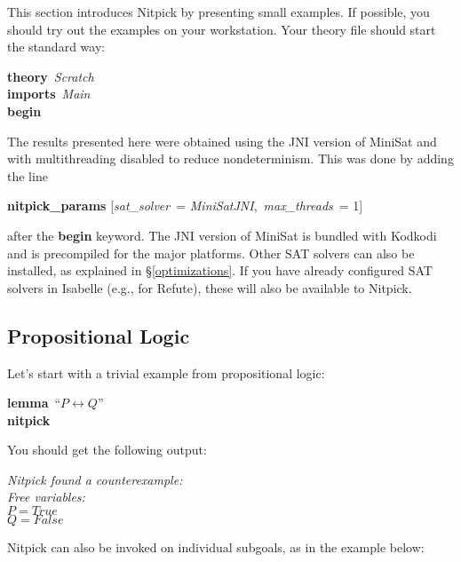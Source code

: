 \documentclass[a4paper,12pt]{article}
\begin{document}
This section introduces Nitpick by presenting small examples. If possible, you
should try out the examples on your workstation. Your theory file should start
the standard way:

\prew
\textbf{theory}~\textit{Scratch} \\
\textbf{imports}~\textit{Main} \\
\textbf{begin}
\postw

The results presented here were obtained using the JNI version of MiniSat and
with multithreading disabled to reduce nondeterminism. This was done by adding
the line

\prew
\textbf{nitpick\_params} [\textit{sat\_solver}~= \textit{MiniSatJNI}, \,\textit{max\_threads}~= 1]
\postw

after the \textbf{begin} keyword. The JNI version of MiniSat is bundled with
Kodkodi and is precompiled for the major platforms. Other SAT solvers can also
be installed, as explained in \S\ref{optimizations}. If you have already
configured SAT solvers in Isabelle (e.g., for Refute), these will also be
available to Nitpick.

\subsection{Propositional Logic}
\label{propositional-logic}

Let's start with a trivial example from propositional logic:

\prew
\textbf{lemma}~``$P \longleftrightarrow Q$'' \\
\textbf{nitpick}
\postw

You should get the following output:

\prew
\slshape
Nitpick found a counterexample: \\[2\smallskipamount]
\hbox{}\qquad Free variables: \nopagebreak \\
\hbox{}\qquad\qquad $P = \textit{True}$ \\
\hbox{}\qquad\qquad $Q = \textit{False}$
\postw

Nitpick can also be invoked on individual subgoals, as in the example below:
\end{document}
